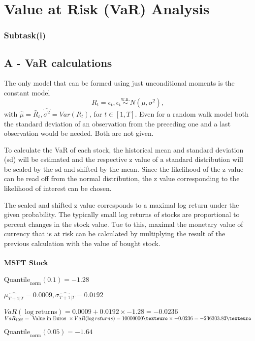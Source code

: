 \section{Value at Risk (VaR) Analysis}
\label{sec:q2_value_at_risk_analysis}

\subsubsection{Subtask(i)}

\subsection{A - VaR calculations}
The only model that can be formed using just unconditional moments is the constant model $$R_t = \epsilon_t, \epsilon_t \overset{\text{w.n.}}{\sim} N(\mu, \sigma^2),$$
with $\hat \mu = \bar R_t, \hat{\sigma^2} = Var(R_t)$, for $t \in [1,T]$. 
Even for a random walk model both the standard deviation of an observation from the preceding one and a last observation would be needed. Both are not given.


To calculate the VaR of each stock, the historical mean and standard deviation (sd) will be estimated and the respective z value of a standard distribution will be scaled by the sd and shifted by the mean. 
Since the likelihood of the z value can be read off from the normal distribution, the z value corresponding to the likelihood of interest can be chosen.


The scaled and shifted z value corresponds to a maximal log return under the given probability. The typically small log returns of stocks are proportional to percent changes in the stock value. Tue to this, maximal the monetary value of currency that is at risk can be calculated by multiplying the result of the previous calculation with the value of bought stock.

\paragraph{MSFT Stock}


$\text{Quantile}_\text{norm}(0.1) = -1.28$

$\hat{\mu_{T+1|T}} = 0.0009, \hat{\sigma_{T+1|T}} = 0.0192$

$VaR(\log \text{returns}) = 0.0009 + 0.0192\times-1.28 = -0.0236$
$VaR_{10\%} = \text{ Value in Euros } \times VaR(\log returns) = 10 000 000 \texteuro \times-0.0236 = -236303.82 \texteuro$


$\text{Quantile}_\text{norm}(0.05) = -1.64$

